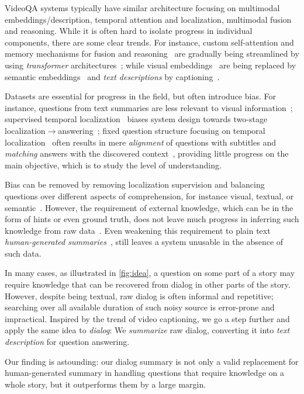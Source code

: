 \documentclass[10pt,twocolumn,letterpaper]{article}
\begin{document}
VideoQA systems typically have similar architecture focusing on multimodal embeddings/description, temporal attention and localization, multimodal fusion and reasoning. While it is often hard to isolate progress in individual components, there are some clear trends. For instance, custom self-attention and memory mechanisms for fusion and reasoning~\cite{Na_2017_ICCV,KCKZ18,FZZ+19} are gradually being streamlined by using \emph{transformer} architectures~\cite{UMDS20,Kim_2020_CVPR,YGC+20}; while visual embeddings~\cite{TZS+16} are being replaced by semantic embeddings~\cite{lei2018tvqa} and \emph{text descriptions} by captioning~\cite{kim2020dense,Chadha2020iPerceive}.

Datasets are essential for progress in the field, but often introduce bias. For instance, questions from text summaries are less relevant to visual information~\cite{TZS+16}; supervised temporal localization~\cite{lei2018tvqa} biases system design towards two-stage localization$\to$answering~\cite{lei2019tvqa+,Kim_2020_CVPR}; fixed question structure focusing on temporal localization~\cite{lei2018tvqa} often results in mere \emph{alignment} of questions with subtitles and \emph{matching} answers with the discovered context~\cite{kim2020dense}, providing little progress on the main objective, which is to study the level of understanding.

Bias can be removed by removing localization supervision and balancing questions over different aspects of comprehension, for instance visual, textual, or semantic~\cite{garcia2020knowit}. However, the requirement of external knowledge, which can be in the form of hints or even ground truth, does not leave much progress in inferring such knowledge from raw data~\cite{garcia2020knowit}. Even weakening this requirement to plain text \emph{human-generated summaries}~\cite{garcia2020knowledge}, still leaves a system unusable in the absence of such data.

In many cases, as illustrated in \autoref{fig:idea}, a question on some part of a story may require knowledge that can be recovered from dialog in other parts of the story. However, despite being textual, raw dialog is often informal and repetitive; searching over all available duration of such noisy source is error-prone and impractical. Inspired by the trend of video captioning, we go a step further and apply the same idea to \emph{dialog}: We \emph{summarize} raw dialog, converting it into \emph{text description} for question answering.

Our finding is astounding: our dialog summary is not only a valid replacement for human-generated summary in handling questions that require knowledge on a whole story, but it outperforms them by a large margin.
\end{document}
